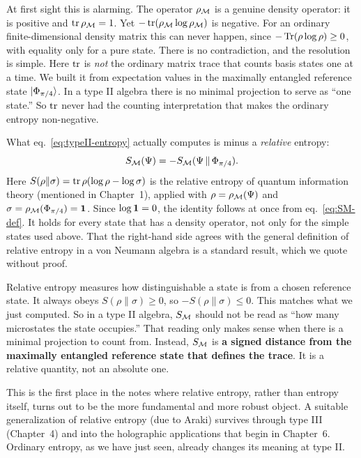 At first sight this is alarming. The operator $\rho_{\mathcal{M}}$ is a genuine density operator: it is positive and
$\operatorname{tr}\rho_{\mathcal{M}}=1$. Yet $-\operatorname{tr}(\rho_{\mathcal{M}}\log\rho_{\mathcal{M}})$ is negative. For an ordinary finite-dimensional density matrix
this can never happen, since $-\operatorname{Tr}(\rho\log\rho)\ge0$, with equality only for a pure state. There is no
contradiction, and the resolution is simple. Here $\operatorname{tr}$ is \emph{not} the ordinary matrix trace that counts basis
states one at a time. We built it from expectation values in the maximally entangled reference state
$\ket{\Phi_{\pi/4}}$. In a type II algebra there is no minimal projection to serve as ``one state.'' So $\operatorname{tr}$
never had the counting interpretation that makes the ordinary entropy non-negative.

What eq.~\eqref{eq:typeII-entropy} actually computes is minus a \emph{relative} entropy:
\[
S_{\mathcal{M}}(\Psi) = -S_{\mathcal{M}}(\Psi\,\|\,\Phi_{\pi/4}) .
\]
Here $S(\rho\|\sigma)=\operatorname{tr}\rho(\log\rho-\log\sigma)$ is the relative entropy of quantum information theory
(mentioned in Chapter~1), applied with $\rho=\rho_{\mathcal{M}}(\Psi)$ and $\sigma=\rho_{\mathcal{M}}(\Phi_{\pi/4})=\mathbf{1}$. Since
$\log\mathbf{1}=0$, the identity follows at once from eq.~\eqref{eq:SM-def}. It holds for every state that has a
density operator, not only for the simple states used above. That the right-hand side agrees with the general
definition of relative entropy in a von Neumann algebra is a standard result, which we quote without proof.

Relative entropy measures how distinguishable a state is from a chosen reference state. It always obeys
$S(\rho\|\sigma)\ge0$, so $-S(\rho\|\sigma)\le0$. This matches what we just computed. So in a type II algebra,
$S_{\mathcal{M}}$ should not be read as ``how many microstates the state occupies.'' That reading only makes sense when
there is a minimal projection to count from. Instead, $S_{\mathcal{M}}$ is \textbf{a signed distance from the maximally
entangled reference state that defines the trace}. It is a relative quantity, not an absolute one.

This is the first place in the notes where relative entropy, rather than entropy itself, turns out to be the more
fundamental and more robust object. A suitable generalization of relative entropy (due to Araki) survives
through type III (Chapter~4) and into the holographic applications that begin in Chapter~6. Ordinary entropy,
as we have just seen, already changes its meaning at type II.

